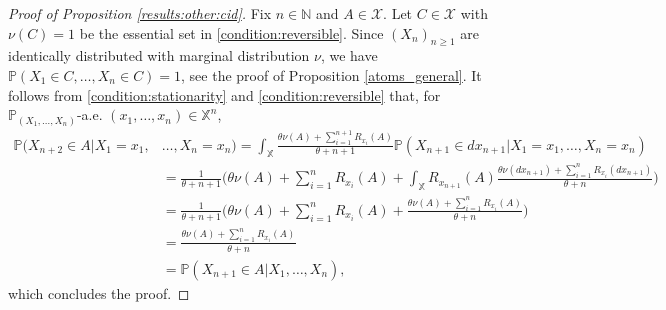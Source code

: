 \documentclass[a4paper]{article}
\theoremstyle{plain}
\theoremstyle{remark}
\theoremstyle{definition}
\begin{document}
\begin{proof}[Proof of Proposition \ref{results:other:cid}]
Fix $n\in\mathbb{N}$ and $A\in\mathcal{X}$. Let $C\in\mathcal{X}$ with $\nu(C)=1$ be the essential set in \eqref{condition:reversible}. Since $(X_n)_{n\geq1}$ are identically distributed with marginal distribution $\nu$, we have $\mathbb{P}(X_1\in C,\ldots,X_n\in C)=1$, see the proof of Proposition \ref{atoms_general}. It follows from \eqref{condition:stationarity} and \eqref{condition:reversible} that, for $\mathbb{P}_{(X_1,\ldots,X_n)}$-a.e. $(x_1,\ldots,x_n)\in\mathbb{X}^n$,
\begingroup\allowdisplaybreaks
\begin{align*}
\mathbb{P}(X_{n+2}\in A|X_1=x_1,&\ldots,X_n=x_n)=\int_\mathbb{X}\frac{\theta\nu(A)+\sum_{i=1}^{n+1}R_{x_i}(A)}{\theta+n+1}\mathbb{P}(X_{n+1}\in dx_{n+1}|X_1=x_1,\ldots,X_n=x_n)\\
&=\frac{1}{\theta+n+1}\bigg(\theta\nu(A)+\sum_{i=1}^nR_{x_i}(A)+\int_\mathbb{X}R_{x_{n+1}}(A)\frac{\theta\nu(dx_{n+1})+\sum_{i=1}^nR_{x_i}(dx_{n+1})}{\theta+n}\biggr)\\
&=\frac{1}{\theta+n+1}\bigg(\theta\nu(A)+\sum_{i=1}^nR_{x_i}(A)+\frac{\theta\nu(A)+\sum_{i=1}^nR_{x_i}(A)}{\theta+n}\biggr)\\
&=\frac{\theta\nu(A)+\sum_{i=1}^nR_{x_i}(A)}{\theta+n}\\
&=\mathbb{P}(X_{n+1}\in A|X_1,\ldots,X_n),
\end{align*}
\endgroup
which concludes the proof.
\end{proof}
\end{document}
